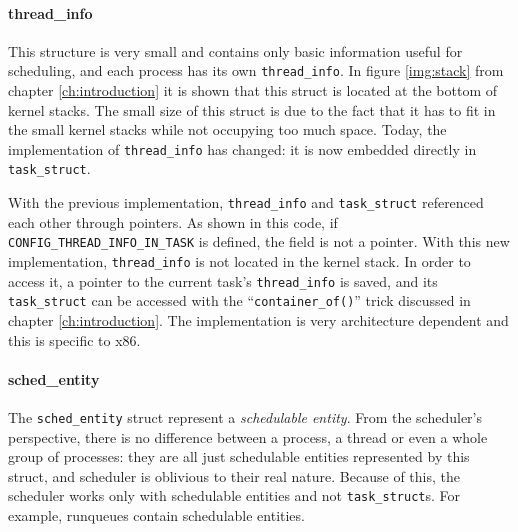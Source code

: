 \paragraph{thread\_info}
This structure is very small and contains only basic information useful for scheduling, and each process has its own \verb|thread_info|. In figure \ref{img:stack} from chapter \ref{ch:introduction} it is shown that this struct is located at the bottom of kernel stacks. The small size of this struct is due to the fact that it has to fit in the small kernel stacks while not occupying too much space. Today, the implementation of \verb|thread_info| has changed: it is now embedded directly in \verb|task_struct|. 

\begin{code}
struct task_struct {
#ifdef CONFIG_THREAD_INFO_IN_TASK
	/*
	 * For reasons of header soup (see current_thread_info()), this
	 * must be the first element of task_struct.
	 */
	struct thread_info  thread_info;
#endif
// ...
\end{code}
With the previous implementation, \verb|thread_info| and \verb|task_struct| referenced each other through pointers. As shown in this code, if \verb|CONFIG_THREAD_INFO_IN_TASK| is defined, the field is not a pointer. With this new implementation, \verb|thread_info| is not located in the kernel stack. In order to access it, a pointer to the current task's \verb|thread_info| is saved, and its \verb|task_struct| can be accessed with the ``\verb|container_of()|'' trick discussed in chapter \ref{ch:introduction}. The implementation is very architecture dependent and this is specific to x86.



\paragraph{sched\_entity}
The \verb|sched_entity| struct represent a \textit{schedulable entity}. From the scheduler's perspective, there is no difference between a process, a thread or even a whole group of processes: they are all just schedulable entities represented by this struct, and scheduler is oblivious to their real nature. Because of this, the scheduler works only with schedulable entities and not \verb|task_struct|s. For example, runqueues contain schedulable entities. 

